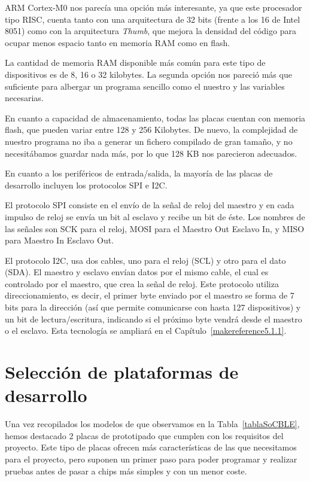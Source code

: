 ARM Cortex-M0 nos parecía una opción más interesante, ya que este procesador tipo RISC, cuenta tanto con una arquitectura de 32 bits (frente a los 16 de Intel 8051) como con la arquitectura \textit{Thumb}, que mejora la densidad del código para ocupar menos espacio tanto en memoria RAM como en flash.

La cantidad de memoria RAM disponible más común para este tipo de dispositivos es de 8, 16 o 32 kilobytes. La segunda opción nos pareció más que suficiente para albergar un programa sencillo como el nuestro y las variables necesarias.

En cuanto a capacidad de almacenamiento, todas las placas cuentan con memoria flash, que pueden variar entre 128 y 256 Kilobytes. De nuevo, la complejidad de nuestro programa no iba a generar un fichero compilado de gran tamaño, y no necesitábamos guardar nada más, por lo que 128 KB nos parecieron adecuados.

En cuanto a los periféricos de entrada/salida, la mayoría de las placas de desarrollo incluyen los protocolos SPI e I2C.

El protocolo SPI consiste en el envío de la señal de reloj del maestro y en cada impulso de reloj se envía un bit al esclavo y recibe un bit de éste. Los nombres de las señales son SCK para el reloj, MOSI para el Maestro Out Esclavo In, y MISO para Maestro In Esclavo Out.

El protocolo I2C, usa dos cables, uno para el reloj (SCL) y otro para el dato (SDA). El maestro y esclavo envían datos por el mismo cable, el cual es controlado por el maestro, que crea la señal de reloj. Este protocolo utiliza direccionamiento, es decir, el primer byte enviado por el maestro se forma de 7 bits para la dirección (así que permite comunicarse con hasta 127 dispositivos) y un bit de lectura/escritura, indicando si el próximo byte vendrá desde el maestro o el esclavo. Esta tecnología se ampliará en el Capítulo~\ref{makereference5.1.1}.

\section{Selección de plataformas de desarrollo}
\label{makereference3.3}

Una vez recopilados los modelos de que observamos en la Tabla~\ref{tablaSoCBLE}, hemos destacado 2 placas de prototipado que cumplen con los requisitos del proyecto. Este tipo de placas ofrecen más características de las que necesitamos para el proyecto, pero suponen un primer paso para poder programar y realizar pruebas antes de pasar a chips más simples y con un menor coste. 

